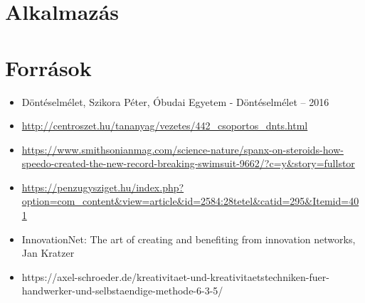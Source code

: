 \documentclass{beamer}
\begin{document}
\section{Alkalmazás}


\section*{Források}
\begin{frame}{\secname}
    \begin{itemize}
        \item Döntéselmélet, Szikora Péter, Óbudai Egyetem - Döntéselmélet – 2016
        \item \url{http://centroszet.hu/tananyag/vezetes/442_csoportos_dnts.html}
        \item \url{https://www.smithsonianmag.com/science-nature/spanx-on-steroids-how-speedo-created-the-new-record-breaking-swimsuit-9662/?c=y&story=fullstor}
        \item \url{https://penzugysziget.hu/index.php?option=com_content&view=article&id=2584:28tetel&catid=295&Itemid=401}
        \item InnovationNet: The art of creating and benefiting from innovation networks, Jan Kratzer
        \item https://axel-schroeder.de/kreativitaet-und-kreativitaetstechniken-fuer-handwerker-und-selbstaendige-methode-6-3-5/
    \end{itemize}
\end{frame}
\end{document}
